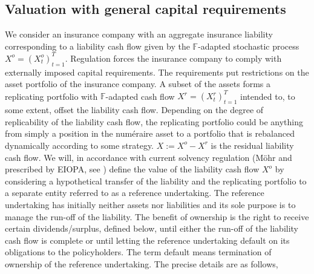 \documentclass[11pt,a4paper]{article}
\newcommand{\filF}{\mathbb{F}}
\begin{document}
\subsection{Valuation with general capital requirements}\label{sec:gcr}

We consider an insurance company with an aggregate insurance liability corresponding to a liability cash flow given by the $\filF$-adapted stochastic process $X^o=(X^o_t)_{t=1}^{T}$. Regulation forces the insurance company to comply with externally imposed capital requirements. The requirements put restrictions on the asset portfolio of the insurance company. 
A subset of the assets forms a replicating portfolio with $\filF$-adapted cash flow $X^r=(X^r_t)_{t=1}^T$ intended to, to some extent, offset the liability cash flow. Depending on the degree of replicability of the liability cash flow, the replicating portfolio could be anything from simply a position in the num\'eraire asset to a portfolio that is rebalanced dynamically according to some strategy. $X:=X^{o}-X^{r}$ is the residual liability cash flow.  
We will, in accordance with current solvency regulation 
(M\"ohr \cite{Moehr-11} and prescribed by EIOPA, see \cite[Article 38]{Commission-del-reg-15})
define the value of the liability cash flow $X^o$ by considering a hypothetical transfer of the liability and the replicating portfolio to a separate entity referred to as a reference undertaking. The reference undertaking has initially neither assets nor liabilities and its sole purpose is to manage the run-off of the liability. 
The benefit of ownership is the right to receive certain dividends/surplus, defined below, until either the run-off of the liability cash flow is complete or until letting the reference undertaking default on its obligations to the policyholders. The term default means termination of ownership of the reference undertaking.
The precise details are as follows,
\end{document}
